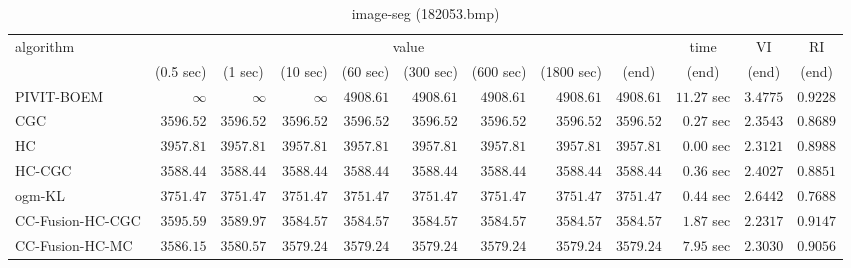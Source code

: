 \begin{table}[H]
\scriptsize
\centering
\caption{image-seg (182053.bmp)}
\label{tab:anytimetable-image-seg-182053.bmp}
\begin{tabular}{lrrrrrrrrrrr}
\toprule
           algorithm &                                   \multicolumn{8}{c}{value} & \multicolumn{1}{c}{time}    & \multicolumn{1}{c}{VI}  & \multicolumn{1}{c}{RI} \\  
\cmidrule(lr){2-9}\cmidrule(lr){10-10} \cmidrule(lr){11-11} \cmidrule(lr){12-12}   
                     & \multicolumn{1}{c}{(0.5 sec)} & \multicolumn{1}{c}{(1 sec)} & \multicolumn{1}{c}{(10 sec)} & \multicolumn{1}{c}{(60 sec)} & \multicolumn{1}{c}{(300 sec)} & \multicolumn{1}{c}{(600 sec)} & \multicolumn{1}{c}{(1800 sec)} & \multicolumn{1}{c}{(end)} & \multicolumn{1}{c}{(end)}    & \multicolumn{1}{c}{(end)}   & \multicolumn{1}{c}{(end)}  \\ \midrule 
          PIVIT-BOEM & $\infty$ & $\infty$ & $\infty$ & $      4908.61$ & $      4908.61$ & $      4908.61$ & $      4908.61$ & $      4908.61$ & $        11.27$ sec    & $       3.4775$  & $       0.9228$ \\ 
                 CGC & $      3596.52$ & $      3596.52$ & $      3596.52$ & $      3596.52$ & $      3596.52$ & $      3596.52$ & $      3596.52$ & $      3596.52$ & $         0.27$ sec    & $       2.3543$  & $       0.8689$ \\ 
                  HC & $      3957.81$ & $      3957.81$ & $      3957.81$ & $      3957.81$ & $      3957.81$ & $      3957.81$ & $      3957.81$ & $      3957.81$ & $         0.00$ sec    & $       2.3121$  & $       0.8988$ \\ 
              HC-CGC & $      3588.44$ & $      3588.44$ & $      3588.44$ & $      3588.44$ & $      3588.44$ & $      3588.44$ & $      3588.44$ & $      3588.44$ & $         0.36$ sec    & $       2.4027$  & $       0.8851$ \\ 
              ogm-KL & $      3751.47$ & $      3751.47$ & $      3751.47$ & $      3751.47$ & $      3751.47$ & $      3751.47$ & $      3751.47$ & $      3751.47$ & $         0.44$ sec    & $       2.6442$  & $       0.7688$ \\ 
    CC-Fusion-HC-CGC & $      3595.59$ & $      3589.97$ & $      3584.57$ & $      3584.57$ & $      3584.57$ & $      3584.57$ & $      3584.57$ & $      3584.57$ & $         1.87$ sec    & $       2.2317$  & $       0.9147$ \\ 
     CC-Fusion-HC-MC & $      3586.15$ & $      3580.57$ & $      3579.24$ & $      3579.24$ & $      3579.24$ & $      3579.24$ & $      3579.24$ & $      3579.24$ & $         7.95$ sec    & $       2.3030$  & $       0.9056$ \\ 

\end{tabular}
\end{table}
